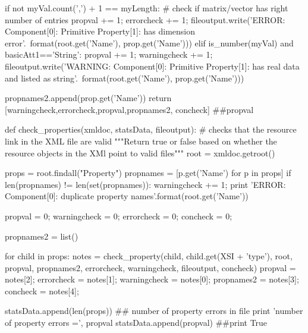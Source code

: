 \begin{MyVerbatim}
                                if not myVal.count(',') + 1 == 
                                 myLength:        # check if matrix/vector 
                                  has right number of entries
                                    propval += 1;
                                    errorcheck += 1;
                                    fileoutput.write('ERROR: 
                                     Component[{0}]: Primitive 
                                      Property[{1}]: has dimension 
                                       error\n'.\
                                        format(root.get('Name'), 
                                         prop.get('Name')))
                        elif is_number(myVal) and basicAtt1=='String':
                            propval += 1;
                            warningcheck += 1;
                            fileoutput.write('WARNING: Component[{0}]: 
                             Primitive Property[{1}]: has real data and 
                              listed as string'.\
                                format(root.get('Name'), prop.get('Name')))
                                         
        propnames2.append(prop.get('Name'))
    return [warningcheck,errorcheck,propval,propnames2, concheck] ##propval




def check_properties(xmldoc, statsData, fileoutput):  # checks that the 
     resource link in the XML file are valid
    """Return true or false based on whether the resource objects in the 
       XMl point to valid files"""
    root = xmldoc.getroot()
    

    props = root.findall("Property")
    propnames = [p.get('Name') for p in props]
    if len(propnames) != len(set(propnames)):
        warningcheck += 1;
        print 'ERROR: Component[{0}]: duplicate property 
         names'.format(root.get('Name'))

    propval = 0;
    warningcheck = 0;
    errorcheck = 0;
    concheck = 0;
    
    propnames2 = list()

    for child in props:
        notes = check_property(child, child.get(XSI + 'type'), root, 
         propval, propnames2, errorcheck, warningcheck, fileoutput, 
          concheck)
        propval = notes[2];
        errorcheck = notes[1];
        warningcheck = notes[0];
        propnames2 = notes[3];
        concheck = notes[4];


    statsData.append(len(props))                                    ## 
     number of property errors in file
    print 'number of property errors =', propval
    statsData.append(propval)
    ##print True


\end{MyVerbatim}
